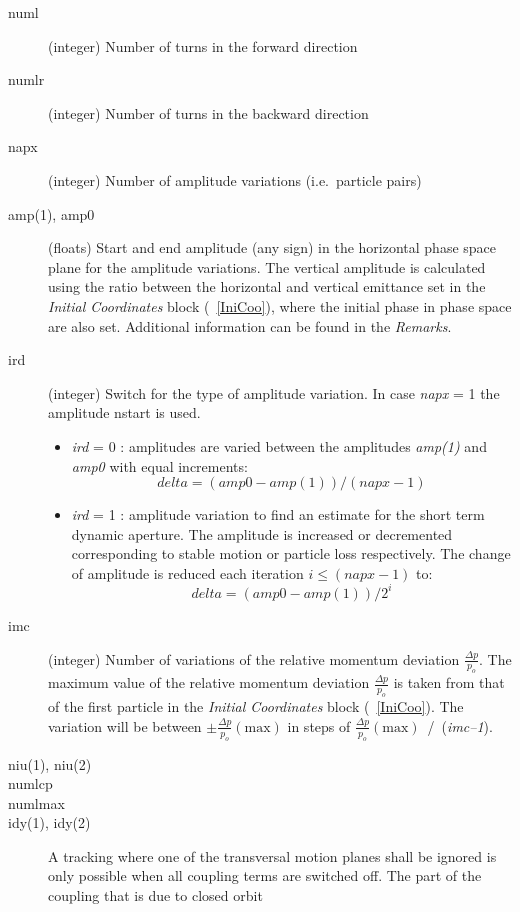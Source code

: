 \documentclass[a4paper,11pt]{report}
\begin{document}
\begin{description}
\item [numl] (integer) Number of turns in the forward direction
\item [numlr] (integer) Number of turns in the backward direction
\item [napx] (integer) Number of amplitude variations (i.e.\ particle pairs)
\item [amp(1), amp0] (floats) Start and end amplitude (any sign) in
  the horizontal phase space plane for the amplitude variations. The
  vertical amplitude is calculated using the ratio between the
  horizontal and vertical emittance set in the {\em Initial
    Coordinates} \/block (~\ref{IniCoo}), where the initial phase in
  phase space are also set. Additional information can be found in the
  {\em Remarks}\/.
\item [ird] (integer) Switch for the type of amplitude variation. In
  case {\em napx} \/= 1 the amplitude nstart is used.
 \begin{itemize}
 \item {\em ird} \/= 0 : amplitudes are varied between the amplitudes
   {\em amp(1)} \/and {\em amp0} \/with equal increments:
   $$
   delta = (amp0-amp(1)) / (napx-1)
   $$
 \item {\em ird} \/= 1 : amplitude variation to find an estimate for
   the short term dynamic aperture. The amplitude is increased or
   decremented corresponding to stable motion or particle loss
   respectively.  The change of amplitude is reduced each iteration
   \mbox{$i \le (napx-1) $} to:
   $$
   delta = (amp0-amp(1)) / 2^{i}
   $$
 \end{itemize}
\item [imc] (integer) Number of variations of the relative momentum
  deviation \mbox{$ \frac{\Delta p}{p_o} $}.  The maximum value of the
  relative momentum deviation \mbox{$ \frac{\Delta p}{p_o} $} is taken
  from that of the first particle in the {\em Initial Coordinates}
  \/block (~\ref{IniCoo}).  The variation will be between \mbox{$ \pm
    \frac{\Delta p}{p_o} (\mathrm{max}) $} in steps of \mbox{$
    \frac{\Delta p}{p_o} (\mathrm{max}) $ / ({\em imc--1}\/).}
\item[niu(1), niu(2)]
\item[numlcp]
\item[numlmax] 
\item [idy(1), idy(2)] A tracking where one of the transversal motion
  planes shall be ignored is only possible when all coupling terms are
  switched off.  The part of the coupling that is due to closed orbit

\end{description}
\end{document}
